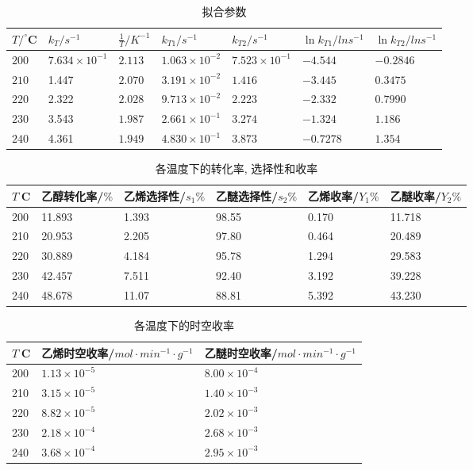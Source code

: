 \documentclass[a4paper]{article}
\begin{document}
\begin{enumerate}
\begin{table}[H]
	\begin{center}
		\caption{拟合参数}
		\begin{tabular}{l|l|l|l|l|l|l}
			\hline
			$T/^\circ$C&$k_{T}/s^{-1}$&$\frac{1}{T}/K^{-1}$& $k_{T1}/s^{-1}$ & $k_{T2}/s^{-1}$ & $\ln k_{T1}/ln s^{-1}$ & $\ln k_{T2}/ln s^{-1}$\\
			\hline
			$200$&$7.634\times 10^{-1}$&$2.113$ & $1.063\times 10^{-2}$ & $7.523\times 10^{-1}$ &$-4.544$&$-0.2846$\\
			\hline
			$210$&1.447&$2.070$ & $3.191\times 10^{-2}$ & $1.416$ &$-3.445$&$0.3475$\\
			\hline
			$220$&2.322&$2.028$ & $9.713\times 10^{-2}$ & $2.223$ &$-2.332$&$0.7990$\\
			\hline
			$230$&3.543&$1.987$ & $2.661\times 10^{-1}$ & $3.274$ &$-1.324$&$1.186 $\\
			\hline
			$240$&4.361&$1.949$ & $4.830\times 10^{-1}$ & $3.873$ &$-0.7278$&$ 1.354$\\
			\hline
		 \end{tabular}
	\end{center}
\end{table}
\begin{table}[H]
	\begin{center}
		\caption{各温度下的转化率, 选择性和收率}
		\begin{tabular}{l|l|l|l|l|l}
			\hline
			$T^\cdot$C	&乙醇转化率/$\%$	&乙烯选择性/$s_1\%$	&乙醚选择性/$s_2\%$	& 乙烯收率/$Y_1\%$ & 乙醚收率/$Y_2\%$\\
			\hline
			200&11.893 &1.393&98.55&0.170 &	11.718 \\
			\hline
			210&20.953 &2.205&97.80&0.464 &	20.489 \\
			\hline
			220&30.889 &4.184&95.78&1.294 &	29.583 \\
			\hline
			230&42.457 &7.511&92.40&3.192 &	39.228 \\
			\hline
			240&48.678 &11.07&88.81&5.392 &	43.230 \\
			\hline
		 \end{tabular}
	\end{center}
\end{table}
\begin{table}[H]
	\begin{center}
		\caption{各温度下的时空收率}
		\begin{tabular}{l|l|l}
			\hline
			$T^\cdot$C&乙烯时空收率/$mol\cdot min^{-1}\cdot g^{-1}$&乙醚时空收率/$mol\cdot min^{-1}\cdot g^{-1}$\\
			\hline
			200&$1.13\times 10^{-5}$&$8.00\times 10^{-4}$\\
			\hline
			210&$3.15\times 10^{-5}$&$1.40\times 10^{-3}$\\
			\hline
			220&$8.82\times 10^{-5}$&$2.02\times 10^{-3}$\\
			\hline
			230&$2.18\times 10^{-4}$&$2.68\times 10^{-3}$\\
			\hline
			240&$3.68\times 10^{-4}$&$2.95\times 10^{-3}$\\
			\hline
		\end{tabular}
	\end{center}
\end{table}


\end{enumerate}
\end{document}
